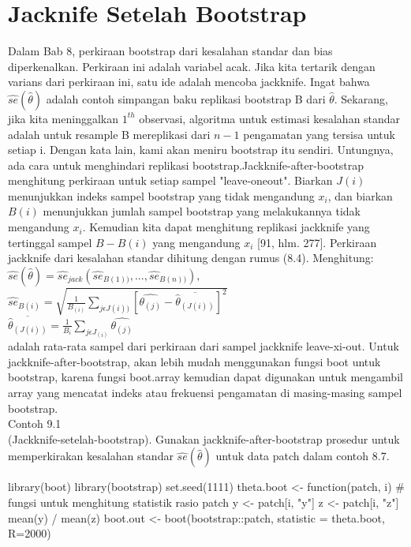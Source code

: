 \documentclass[a4paper,12pt]{article}
\theoremstyle{definition}
\begin{document}
\section{Jacknife Setelah Bootstrap}
Dalam Bab 8, perkiraan bootstrap dari kesalahan standar dan bias diperkenalkan. Perkiraan ini adalah variabel acak. Jika kita tertarik dengan varians dari perkiraan ini, satu ide adalah mencoba jackknife. Ingat bahwa $\widehat{se}(\widehat{\theta})$ adalah contoh simpangan baku replikasi bootstrap B dari $\widehat{\theta}$. Sekarang, jika kita meninggalkan $1^{th}$ observasi, algoritma untuk estimasi kesalahan standar adalah untuk resample B mereplikasi dari $n-1$ pengamatan yang tersisa untuk setiap i. Dengan kata lain, kami akan meniru bootstrap itu sendiri. Untungnya, ada cara untuk menghindari replikasi bootstrap.Jackknife-after-bootstrap menghitung perkiraan untuk setiap sampel "leave-oneout".  Biarkan $J(i)$ menunjukkan indeks sampel bootstrap yang tidak mengandung $x_{i}$, dan biarkan $B(i)$ menunjukkan jumlah sampel bootstrap yang melakukannya tidak mengandung $x_{i}$. Kemudian kita dapat menghitung replikasi jackknife yang tertinggal sampel $B-B(i)$ yang mengandung $x_{i}$ [91, hlm. 277]. Perkiraan jackknife dari kesalahan standar dihitung dengan rumus (8.4). Menghitung:\\

$\widehat{se}(\widehat{\theta})= \widehat{se}_{jack}(\widehat{se}_{B(1))}, ...,\widehat{se}_{B(n))}),$\\

$\widehat{se}_{B(i)}=\sqrt{\frac{1}{B_{(i)}}\sum_{j\epsilon J(i))}^{} [\widehat{\theta_{(j)}} -\overline{\widehat{\theta}_{(J(i))}}]^{2}}$\\

$\overline{\widehat{\theta}_{(J(i))}}=\frac{1}{B_{i}}\sum_{j\epsilon J_{(i)}}^{}\widehat{\theta_{(j)}}$\\

adalah rata-rata sampel dari perkiraan dari sampel jackknife leave-xi-out. Untuk jackknife-after-bootstrap, akan lebih mudah menggunakan fungsi boot untuk bootstrap, karena fungsi boot.array kemudian dapat digunakan untuk mengambil array yang mencatat indeks atau frekuensi pengamatan di masing-masing sampel bootstrap.\\

Contoh 9.1\\ 

(Jackknife-setelah-bootstrap). Gunakan jackknife-after-bootstrap prosedur untuk memperkirakan kesalahan standar $\widehat{se}(\widehat{\theta})$ untuk data patch dalam contoh 8.7.\\
\begin{spverbatim}
library(boot)
library(bootstrap)
set.seed(1111)
theta.boot <- function(patch, i) {
    # fungsi untuk menghitung statistik rasio patch
y <- patch[i, "y"]
z <- patch[i, "z"]
mean(y) / mean(z)
}
boot.out <- boot(bootstrap::patch,
statistic = theta.boot, R=2000)
\end{spverbatim}
\end{document}
